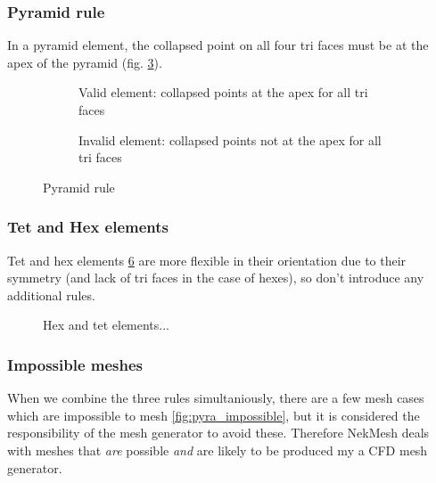 {\subsubsection{Pyramid rule}
In a pyramid element, the collapsed point on all four tri faces must be at the apex of the pyramid (fig. \ref{fig:pyra_rule}).


\begin{figure}[h!]
    \centering
    \begin{subfigure}[b]{0.45\textwidth}
        \centering
        
        \caption{Valid element: collapsed points at the apex for all tri faces}
        \label{fig:pyra_rule_ok}
    \end{subfigure}
    \hfill
    \begin{subfigure}[b]{0.45\textwidth}
        \centering
        
        \caption{Invalid element: collapsed points not at the apex for all tri faces}
        \label{fig:pyra_rule_bad}
    \end{subfigure}
    \caption{Pyramid rule}
    \label{fig:pyra_rule}
\end{figure}

\subsubsection{Tet and Hex elements}
Tet and hex elements \ref{fig:hex_and_tet} are more flexible in their orientation due to their symmetry (and lack of tri faces in the case of hexes), so don't introduce any additional rules.

\begin{figure}[h!]
    \centering
    \begin{subfigure}[b]{0.45\textwidth}
        \centering
        
        \caption{}
        \label{fig:tet_ok}
    \end{subfigure}
    \hfill
    \begin{subfigure}[b]{0.45\textwidth}
        \centering
        
        \caption{}
        \label{fig:hex_ok}
    \end{subfigure}
    \caption{Hex and tet elements...}
    \label{fig:hex_and_tet}
\end{figure}

\subsubsection{Impossible meshes}
When we combine the three rules simultaniously, there are a few mesh cases which are impossible to mesh \ref{fig:pyra_impossible}, but it is considered the responsibility of the mesh generator to avoid these. Therefore NekMesh deals with meshes that \textit{are} possible \textit{and} are likely to be produced my a CFD mesh generator.\\

}
